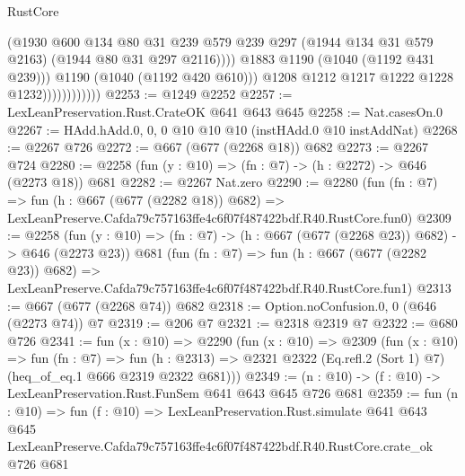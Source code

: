 \begin{lexlean}{RustCore}
\begin{coremodule}
                                    (@1930
                                      @600
                                      @134
                                      @80
                                      @31
                                      @239
                                      @579
                                      @239
                                      @297
                                      (@1944 @134 @31 @579 @2163)
                                      (@1944 @80 @31 @297 @2116))))
                                @1883
                                @1190
                                (@1040 (@1192 @431 @239)))
                              @1190
                              (@1040 (@1192 @420 @610)))
                            @1208
                            @1212
                            @1217
                            @1222
                            @1228
                            @1232))))))))))))
@2253 := @1249 @2252
@2257 := LexLeanPreservation.Rust.CrateOK @641 @643 @645
@2258 := Nat.casesOn.{0}
@2267 := HAdd.hAdd.{0, 0, 0} @10 @10 @10 (instHAdd.{0} @10 instAddNat)
@2268 := @2267 @726
@2272 := @667 (@677 (@2268 @18)) @682
@2273 := @2267 @724
@2280 := @2258 (fun (y : @10) => (fn : @7) -> (h : @2272) -> @646 (@2273 @18)) @681
@2282 := @2267 Nat.zero
@2290 := @2280
    (fun (fn : @7) =>
    fun (h : @667 (@677 (@2282 @18)) @682) =>
    LexLeanPreserve.Cafda79c757163ffe4c6f07f487422bdf.R40.RustCore.fun0)
@2309 := @2258
    (fun (y : @10) => (fn : @7) -> (h : @667 (@677 (@2268 @23)) @682) -> @646 (@2273 @23))
    @681
    (fun (fn : @7) =>
    fun (h : @667 (@677 (@2282 @23)) @682) =>
    LexLeanPreserve.Cafda79c757163ffe4c6f07f487422bdf.R40.RustCore.fun1)
@2313 := @667 (@677 (@2268 @74)) @682
@2318 := Option.noConfusion.{0, 0} (@646 (@2273 @74)) @7
@2319 := @206 @7
@2321 := @2318 @2319 @7
@2322 := @680 @726
@2341 := fun (x : @10) =>
  @2290
    (fun (x : @10) =>
    @2309
      (fun (x : @10) =>
      fun (fn : @7) =>
      fun (h : @2313) =>
      @2321 @2322 (Eq.refl.{2} (Sort 1) @7) (heq_of_eq.{1} @666 @2319 @2322 @681)))
@2349 := (n : @10) -> (f : @10) -> LexLeanPreservation.Rust.FunSem @641 @643 @645 @726 @681
@2359 := fun (n : @10) =>
  fun (f : @10) =>
  LexLeanPreservation.Rust.simulate
    @641
    @643
    @645
    LexLeanPreserve.Cafda79c757163ffe4c6f07f487422bdf.R40.RustCore.crate_ok
    @726
    @681
\end{coremodule}
\end{lexlean}
